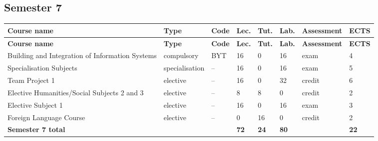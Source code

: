 \documentclass[12pt,a4paper]{article}
\newcommand{\thdrule}{\noalign{\global\setlength{\extrarowheight}{0pt}}}
\newcommand{\thdend}{\noalign{\global\setlength{\extrarowheight}{4pt}}}
\begin{document}
\clearpage
\subsection*{Semester 7}

{\scriptsize
\begin{longtable}{m{5.0cm}m{1.9cm}m{0.75cm}m{0.85cm}m{0.85cm}m{0.85cm}m{1.45cm}m{0.9cm}}
\thdrule\toprule
\rowcolor{pjatkRed}
{\color{white}\footnotesize\textbf{\vphantom{Ag}Course name}} & {\color{white}\footnotesize\textbf{\vphantom{Ag}Type}} & {\color{white}\footnotesize\textbf{\vphantom{Ag}Code}} & {\color{white}\footnotesize\textbf{\vphantom{Ag}Lec.}} & {\color{white}\footnotesize\textbf{\vphantom{Ag}Tut.}} & {\color{white}\footnotesize\textbf{\vphantom{Ag}Lab.}} & {\color{white}\footnotesize\textbf{\vphantom{Ag}Assessment}} & {\color{white}\footnotesize\textbf{\vphantom{Ag}ECTS}} \\
\midrule\thdend
\endfirsthead
\thdrule\toprule
\rowcolor{pjatkRed}
{\color{white}\footnotesize\textbf{\vphantom{Ag}Course name}} & {\color{white}\footnotesize\textbf{\vphantom{Ag}Type}} & {\color{white}\footnotesize\textbf{\vphantom{Ag}Code}} & {\color{white}\footnotesize\textbf{\vphantom{Ag}Lec.}} & {\color{white}\footnotesize\textbf{\vphantom{Ag}Tut.}} & {\color{white}\footnotesize\textbf{\vphantom{Ag}Lab.}} & {\color{white}\footnotesize\textbf{\vphantom{Ag}Assessment}} & {\color{white}\footnotesize\textbf{\vphantom{Ag}ECTS}} \\
\midrule\thdend
\endhead
\rowcolor{tableRowLight} Building and Integration of Information Systems & {\scriptsize compulsory} & BYT & 16 & 0 & 16 & {\scriptsize exam} & 4 \\
\rowcolor{tableElective} Specialisation Subjects & {\scriptsize specialisation} & -- & 16 & 0 & 16 & {\scriptsize exam} & 5 \\
\rowcolor{tableElective} Team Project 1 & {\scriptsize elective} & -- & 16 & 0 & 32 & {\scriptsize credit} & 6 \\
\rowcolor{tableElective} Elective Humanities/Social Subjects 2 and 3 & {\scriptsize elective} & -- & 8 & 8 & 0 & {\scriptsize credit} & 2 \\
\rowcolor{tableElective} Elective Subject 1 & {\scriptsize elective} & -- & 16 & 0 & 16 & {\scriptsize exam} & 3 \\
\rowcolor{tableElective} Foreign Language Course & {\scriptsize elective} & -- & 0 & 16 & 0 & {\scriptsize credit} & 2 \\
\midrule[\heavyrulewidth]
\rowcolor{tableSummary} \textbf{Semester 7 total} & & & \textbf{72} & \textbf{24} & \textbf{80} & & \textbf{22} \\
\bottomrule
\end{longtable}}
\end{document}
